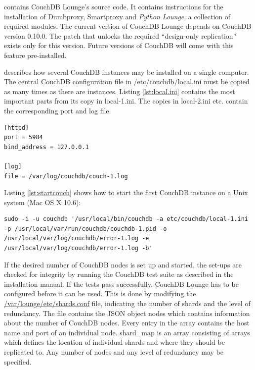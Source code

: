 \cite{lounge:website} contains CouchDB Lounge's source code. It contains instructions for the installation of Dumbproxy, Smartproxy and \textit{Python Lounge}, a collection of required modules. The current version of CouchDB Lounge depends on CouchDB version 0.10.0. The patch that unlocks the required \enquote{design-only replication} exists only for this version. Future versions of CouchDB will come with this feature pre-installed.

\cite{lounge:twoinstances} describes how several CouchDB instances may be installed on a single computer. The central CouchDB configuration file in {\selectfont /etc/couchdb/local.ini} must be copied as many times as there are instances. Listing \ref{lst:local.ini} contains the most important parts from its copy in {\selectfont local-1.ini}. The copies in {\selectfont local-2.ini} etc. contain the corresponding port and log file.
 
\medskip
\begin{lstlisting}[caption=Extract from the CouchDB configuration file, label=lst:local.ini]
[httpd] 
port = 5984
bind_address = 127.0.0.1

[log]
file = /var/log/couchdb/couch-1.log
\end{lstlisting}


Listing \ref{lst:startcouch} shows how to start the first CouchDB instance on a Unix system (Mac OS X 10.6):


\medskip
\begin{lstlisting}[caption=Starting a CouchDB instance, label=lst:startcouch]
sudo -i -u couchdb '/usr/local/bin/couchdb -a etc/couchdb/local-1.ini -p /usr/local/var/run/couchdb/couchdb-1.pid -o /usr/local/var/log/couchdb/error-1.log -e /usr/local/var/log/couchdb/error-1.log -b'
\end{lstlisting}

If the desired number of CouchDB nodes is set up and started, the set-ups are checked for integrity by running the CouchDB test suite as described in the installation manual. If the tests pass successfully, CouchDB Lounge has to be configured before it can be used. This is done by modifying the \url{/var/lounge/etc/shards.conf} file, indicating the number of shards and the level of redundancy. The file contains the JSON object {\selectfont nodes} which contains information about the number of CouchDB nodes. Every entry in the array contains the host name and port of an individual node. {\selectfont shard\_map} is an array consisting of arrays which defines the location of individual shards and where they should be replicated to. Any number of nodes and any level of redundancy may be specified.

